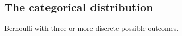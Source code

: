 
\subsection{The categorical distribution}

Bernoulli with three or more discrete possible outcomes.

